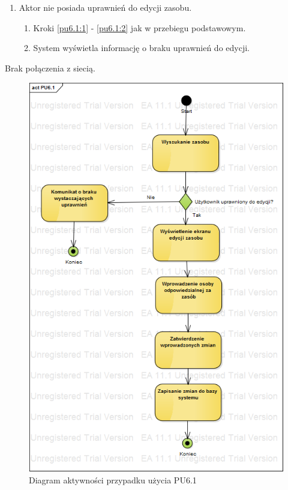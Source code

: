 \begin{enumerate}
	\item Aktor nie posiada uprawnień do edycji zasobu.
	\begin{enumerate}[label*=\arabic*.]
		\item Kroki \ref{pu6.1:1} - \ref{pu6.1:2} jak w przebiegu podstawowym.
		\item System wyświetla informację o braku uprawnień do edycji.
	\end{enumerate}
\end{enumerate}
Brak połączenia z siecią.

\begin{figure}[h!]
	\centering
	\includegraphics[scale=0.6]{img/diagrams/activityDiagrams/PU61}
	\caption{Diagram aktywności przypadku użycia PU6.1 \label{fig:labelADPU6.1}}
\end{figure}

